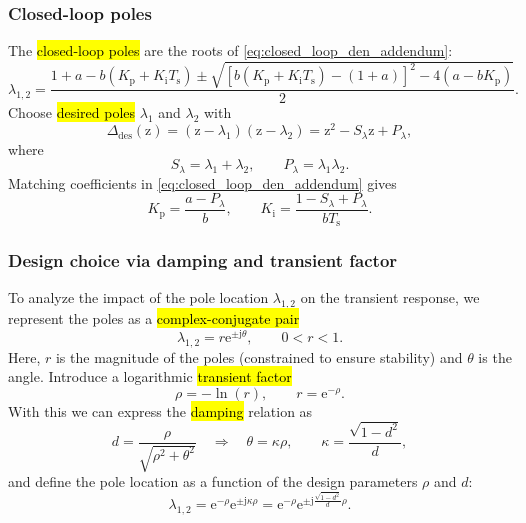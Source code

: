 \begin{frame}
    \frametitle{Closed-loop poles}
    The \hl{closed-loop poles} are the roots of \eqref{eq:closed_loop_den_addendum}:
    \begin{equation}
        \lambda_{1,2}=\frac{1+a-b\left(K_\mathrm{p}+K_\mathrm{i}T_\mathrm{s}\right)\pm
            \sqrt{\left[b\left(K_\mathrm{p}+K_\mathrm{i}T_\mathrm{s}\right)-(1+a)\right]^2-4\left(a-bK_\mathrm{p}\right)}}{2}.
        \label{eq:poles_addendum}
    \end{equation}\pause%
    Choose \hl{desired poles} $\lambda_1$ and $\lambda_2$ with
    \begin{equation}
        \Delta_\mathrm{des}(\mathrm{z})=(\mathrm{z}-\lambda_1)(\mathrm{z}-\lambda_2)
        =\mathrm{z}^2-S_\lambda\mathrm{z}+P_\lambda,
    \end{equation}\pause%
    where
    \begin{equation}
        S_\lambda=\lambda_1+\lambda_2,
        \qquad
        P_\lambda=\lambda_1\lambda_2.
    \end{equation}\pause%
    Matching coefficients in \eqref{eq:closed_loop_den_addendum} gives
    \begin{equation}
        K_\mathrm{p}=\frac{a-P_\lambda}{b},
        \qquad
        K_\mathrm{i}=\frac{1-S_\lambda+P_\lambda}{bT_\mathrm{s}}.
        \label{eq:pole_placement_gains_addendum}
    \end{equation}
\end{frame}

\begin{frame}
    \frametitle{Design choice via damping and transient factor}
    To analyze the impact of the pole location $\lambda_{1,2}$ on the transient response, we represent the poles as a \hl{complex-conjugate pair}
    \begin{equation}
        \lambda_{1,2}=r\mathrm{e}^{\pm \mathrm{j}\theta},
        \qquad 0<r<1.
    \end{equation}\pause%
    Here, $r$ is the magnitude of the poles (constrained to ensure stability) and $\theta$ is the angle. \pause Introduce a logarithmic \hl{transient factor}
    \begin{equation}
        \rho=-\ln(r),\qquad r=\mathrm{e}^{-\rho}.
    \end{equation}\pause%
    With this we can express the \hl{damping} relation as
    \begin{equation}
        d=\frac{\rho}{\sqrt{\rho^2+\theta^2}}
        \quad \Rightarrow \quad
        \theta=\kappa\rho,
        \qquad
        \kappa=\frac{\sqrt{1-d^2}}{d},
    \end{equation}\pause%
    and define the pole location as a function of the design parameters $\rho$ and $d$:
    \begin{equation}
        \lambda_{1,2}=\mathrm{e}^{-\rho}\mathrm{e}^{\pm \mathrm{j}\kappa\rho} = \mathrm{e}^{-\rho}\mathrm{e}^{\pm \mathrm{j}\frac{\sqrt{1-d^2}}{d}\rho}.
    \end{equation}
\end{frame}

